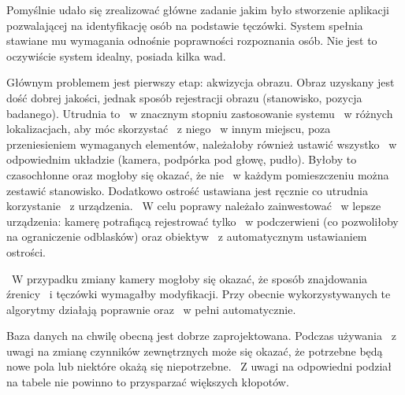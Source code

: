 Pomyślnie udało się zrealizować główne zadanie jakim było stworzenie aplikacji pozwalającej na identyfikację osób na podstawie tęczówki. System spełnia stawiane mu wymagania odnośnie poprawności rozpoznania osób. Nie jest to oczywiście system idealny, posiada kilka wad.

Głównym problemem jest pierwszy etap: akwizycja obrazu. Obraz uzyskany jest dość dobrej jakości, jednak sposób rejestracji obrazu (stanowisko, pozycja badanego). Utrudnia to ~w znacznym stopniu zastosowanie systemu ~w różnych lokalizacjach, aby móc skorzystać ~z niego ~w innym miejscu, poza przeniesieniem wymaganych elementów, należałoby również ustawić wszystko ~w odpowiednim układzie (kamera, podpórka pod głowę, pudło). Byłoby to czasochłonne oraz mogłoby się okazać, że nie ~w każdym pomieszczeniu można zestawić stanowisko. Dodatkowo ostrość ustawiana jest ręcznie co utrudnia korzystanie ~z urządzenia. ~W celu poprawy należało zainwestować ~w lepsze urządzenia: kamerę potrafiącą rejestrować tylko ~w podczerwieni (co pozwoliłoby na ograniczenie odblasków) oraz obiektyw ~z automatycznym ustawianiem ostrości.

~W przypadku zmiany kamery mogłoby się okazać, że sposób znajdowania źrenicy ~i tęczówki wymagałby modyfikacji. Przy obecnie wykorzystywanych te algorytmy działają poprawnie oraz ~w pełni automatycznie.

Baza danych na chwilę obecną jest dobrze zaprojektowana. Podczas używania ~z uwagi na zmianę czynników zewnętrznych może się okazać, że potrzebne będą nowe pola lub niektóre okażą się niepotrzebne. ~Z uwagi na odpowiedni podział na tabele nie powinno to przysparzać większych kłopotów.




